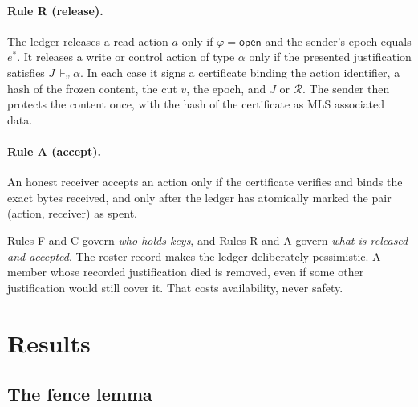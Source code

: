 \documentclass[aps,prx,reprint,superscriptaddress,nofootinbib,floatfix]{revtex4-2}
\theoremstyle{remark}
\newcommand{\justifies}{\Vdash}           %
\newcommand{\rec}{\mathcal R}             %
\newcommand{\open}{\textsf{open}}
\begin{document}
\paragraph*{Rule R (release).} The ledger releases a read action $a$ only if $\varphi=\open$ and the sender's epoch equals $e^\ast$. It releases a write or control action of type $\alpha$ only if the presented justification satisfies $J\justifies_v\alpha$. In each case it signs a certificate binding the action identifier, a hash of the frozen content, the cut $v$, the epoch, and $J$ or $\rec$. The sender then protects the content once, with the hash of the certificate as MLS associated data.

\paragraph*{Rule A (accept).} An honest receiver accepts an action only if the certificate verifies and binds the exact bytes received, and only after the ledger has atomically marked the pair (action, receiver) as spent.

Rules F and C govern \emph{who holds keys}, and Rules R and A govern \emph{what is released and accepted}. The roster record makes the ledger deliberately pessimistic. A member whose recorded justification died is removed, even if some other justification would still cover it. That costs availability, never safety.

\section{Results}\label{sec:results}

\subsection{The fence lemma}
\end{document}
